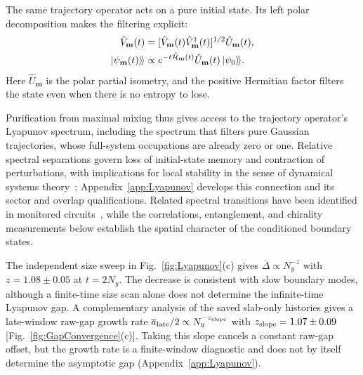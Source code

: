 \documentclass[aps,prb,10pt,twocolumn,superscriptaddress,longbibliography,floatfix]{revtex4-2}
\newcommand{\kett}[1]{\ket{#1}\!\rangle}
\newcommand{\rec}{\mathbf m}   %
\newcommand{\newtext}[1]{{\color{blue}#1}}
\begin{document}
{{\color{blue}
The same trajectory operator acts on a pure initial state. Its left polar decomposition makes the filtering explicit:
\begin{equation}
 \begin{aligned}
 \hat V_{\rec}(t)&=[\hat V_{\rec}(t)\hat V_{\rec}^\dagger(t)]^{1/2}
                   \hat U_{\rec}(t),\\
 \kett{\psi_{\rec}(t)}&\propto e^{-t\hat{\mathcal H}_{\rec}(t)}
                       \hat U_{\rec}(t)\kett{\psi_0}.
 \end{aligned}
 \label{eq:PureTrajectoryFiltering}
\end{equation}
Here $\hat U_{\rec}$ is the polar partial isometry, and the positive Hermitian factor filters the state even when there is no entropy to lose.
}

\newtext{Purification from maximal mixing thus gives access to the trajectory operator's Lyapunov spectrum, including the spectrum that filters pure Gaussian trajectories, whose full-system occupations are already zero or one. Relative spectral separations govern loss of initial-state memory and contraction of perturbations, with implications for local stability in the sense of dynamical systems theory~\cite{BulchandaniSondhiChalker2024}; Appendix~\ref{app:Lyapunov} develops this connection and its sector and overlap qualifications. Related spectral transitions have been identified in monitored circuits~\cite{Oshima2025}, while the correlations, entanglement, and chirality measurements below establish the spatial character of the conditioned boundary states.}

The independent size sweep in Fig.~\ref{fig:Lyapunov}(c) gives $\overline\Delta\propto N_y^{-z}$ with $z=1.08\pm0.05$ at $t=2N_y$. The decrease is consistent with slow boundary modes, although a finite-time size scan alone does not determine the infinite-time Lyapunov gap. \newtext{A complementary analysis of the saved slab-only histories gives a late-window raw-gap growth rate $\overline a_{\rm late}/2\propto N_y^{-z_{\rm slope}}$ with $z_{\rm slope}=1.07\pm0.09$ [Fig.~\ref{fig:GapConvergence}(c)]. Taking this slope cancels a constant raw-gap offset, but the growth rate is a finite-window diagnostic and does not by itself determine the asymptotic gap (Appendix~\ref{app:Lyapunov}).}

}
\end{document}

